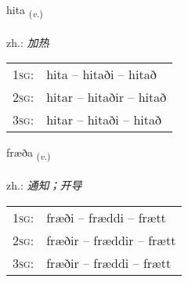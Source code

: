 \documentclass[frontgrid, backgrid]{flacards}\usepackage[]{graphicx}\usepackage[]{xcolor}
\begin{document}
\renewcommand{\blhead}{\vskip5pt {\small\bfseries\footnotesize Sagnorð | 动词 }}
\renewcommand{\bcfoot}{\vskip5pt \hspace{2pt}{\small\bfseries\footnotesize 3K}}


{hita \small{\textsubscript{(\textit{v.})}} \\[1ex] %
\textphonetic{[hɪːta]} \\
zh.: \emph{加热} \\  [2ex]
\renewcommand*{\arraystretch}{0.8}
\begin{tabular}{p{1cm}l}
\textsc{1sg}: & hita -- hitaði -- hitað \\ 
\textsc{2sg}: & hitar -- hitaðir -- hitað \\ 
\textsc{3sg}: & hitar -- hitaði -- hitað \\ 
\end{tabular}
}

\renewcommand{\flhead}{\vskip5pt \fboxsep=0pt {\small\bfseries\footnotesize Sagnorð | 动词}}
\renewcommand{\fcfoot}{\vskip5pt \fboxsep=0pt \hspace{2pt}{\small\bfseries\footnotesize 3K}}

\renewcommand{\blhead}{\vskip5pt {\small\bfseries\footnotesize Sagnorð | 动词 }}
\renewcommand{\bcfoot}{\vskip5pt \hspace{2pt}{\small\bfseries\footnotesize 3K}}


{fræða \small{\textsubscript{(\textit{v.})}} \\[1ex] %
\textphonetic{[fraiːða]} \\
zh.: \emph{通知；开导} \\  [2ex]
\renewcommand*{\arraystretch}{0.8}
\begin{tabular}{p{1cm}l}
\textsc{1sg}: & fræði -- fræddi -- frætt \\ 
\textsc{2sg}: & fræðir -- fræddir -- frætt \\ 
\textsc{3sg}: & fræðir -- fræddi -- frætt \\ 
\end{tabular}
}
\end{document}
